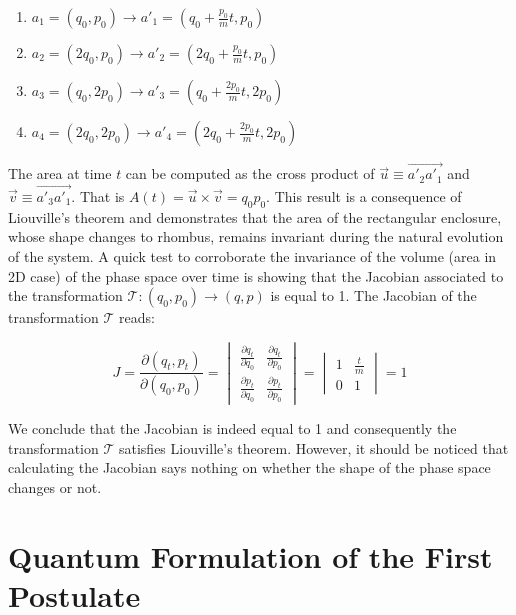 \documentclass[12pt,a4paper]{report}
\newcommand{\esp}{\vspace{0.5cm}}
\begin{document}
	\esp
	
	\begin{enumerate}
		\item $a_1 = (q_0, p_0) \longrightarrow a'_1 = (q_0 + \frac{p_0}{m}t, p_0)$
		\item $a_2 = (2q_0, p_0) \longrightarrow a'_2 = (2q_0 + \frac{p_0}{m}t, p_0)$
		\item $a_3 = (q_0, 2p_0) \longrightarrow a'_3 = (q_0 + \frac{2p_0}{m}t, 2p_0)$
		\item $a_4 = (2q_0, 2p_0) \longrightarrow a'_4 = (2q_0 + \frac{2p_0}{m}t, 2p_0)$
	\end{enumerate}
	
	\esp
	
	The area at time $t$ can be computed as the cross product of $\vec{u} \equiv \vec{a'_2 a'_1}$ and $\vec{v} \equiv \vec{a'_3 a'_1}$. That is $A(t) = \vec{u} \times \vec{v} = q_0 p_0$. This result is a consequence of Liouville’s theorem and demonstrates that the area of the rectangular enclosure, whose shape changes to rhombus, remains invariant during the natural evolution of the system. A quick test to corroborate the invariance of the volume (area in 2D case) of the phase space over time is showing that the Jacobian associated to the transformation $\mathcal{T} : (q_0, p_0) \to (q, p)$ is equal to 1. The Jacobian of the transformation $\mathcal{T}$ reads:
	
	\esp
	
	\begin{equation}
		J = \frac{\partial(q_t, p_t)}{\partial(q_0, p_0)} = \begin{vmatrix} \frac{\partial q_t}{\partial q_0} & \frac{\partial q_t}{\partial p_0} \\ \frac{\partial p_t}{\partial q_0} & \frac{\partial p_t}{\partial p_0} \end{vmatrix} = \begin{vmatrix} 1 & \frac{t}{m} \\ 0 & 1 \end{vmatrix} = 1
	\end{equation}
	
	\esp
	
	We conclude that the Jacobian is indeed equal to 1 and consequently the transformation $\mathcal{T}$ satisfies Liouville’s theorem. However, it should be noticed that calculating the Jacobian says nothing on whether the shape of the phase space changes or not.
	
	\section{Quantum Formulation of the First Postulate}
	
\end{document}
